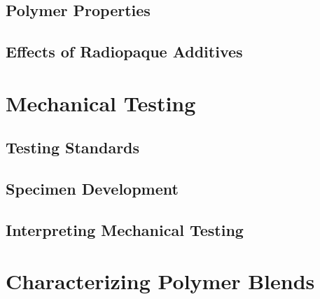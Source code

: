 \subsection{Polymer Properties\label{sec:literatureReview:materialProperties:polymers}}

\subsection{Effects of Radiopaque Additives\label{sec:literatureReview:materialProperties:BaSO4}}

\section{Mechanical Testing\label{sec:literatureReview:mechanicalTesting}}

\subsection{Testing Standards\label{sec:literatureReview:mechanicalTesting:standards}}

\subsection{Specimen Development\label{sec:literatureReview:mechanicalTesting:specimens}}

\subsection{Interpreting Mechanical Testing\label{sec:literatureReview:mechanicalTesting:interpretation}}

\section{Characterizing Polymer Blends\label{sec:literatureReview:characterization}}

